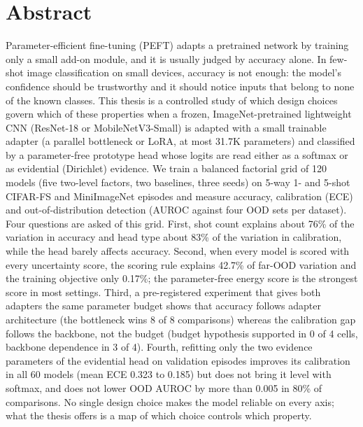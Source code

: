 \documentclass[12pt,a4paper,oneside]{report}
\begin{document}
\chapter*{Abstract}
Parameter-efficient fine-tuning (PEFT) adapts a pretrained network by training only a small add-on
module, and it is usually judged by accuracy alone. In few-shot image classification on small devices,
accuracy is not enough: the model's confidence should be trustworthy and it should notice inputs that
belong to none of the known classes. This thesis is a controlled study of which design choices govern
which of these properties when a frozen, ImageNet-pretrained lightweight CNN (ResNet-18 or
MobileNetV3-Small) is adapted with a small trainable adapter (a parallel bottleneck or LoRA, at most
31.7K parameters) and classified by a parameter-free prototype head whose logits are read either as a
softmax or as evidential (Dirichlet) evidence. We train a balanced factorial grid of 120 models (five
two-level factors, two baselines, three seeds) on 5-way 1- and 5-shot CIFAR-FS and MiniImageNet
episodes and measure accuracy, calibration (ECE) and out-of-distribution detection (AUROC against four
OOD sets per dataset). Four questions are asked of this grid. First, shot count explains about 76\% of the
variation in accuracy and head type about 83\% of the variation in calibration, while the head barely
affects accuracy. Second, when every model is scored with every uncertainty score, the scoring rule
explains 42.7\% of far-OOD variation and the training objective only 0.17\%; the parameter-free energy
score is the strongest score in most settings. Third, a pre-registered experiment that gives both
adapters the same parameter budget shows that accuracy follows adapter architecture (the bottleneck
wins 8 of 8 comparisons) whereas the calibration gap follows the backbone, not the budget (budget
hypothesis supported in 0 of 4 cells, backbone dependence in 3 of 4). Fourth, refitting only the two
evidence parameters of the evidential head on validation episodes improves its calibration in all 60
models (mean ECE 0.323 to 0.185) but does not bring it level with softmax, and does not lower OOD
AUROC by more than 0.005 in 80\% of comparisons. No single design choice makes the model reliable on every
axis; what the thesis offers is a map of which choice controls which property.

\tableofcontents
\listoffigures
\listoftables
\end{document}
